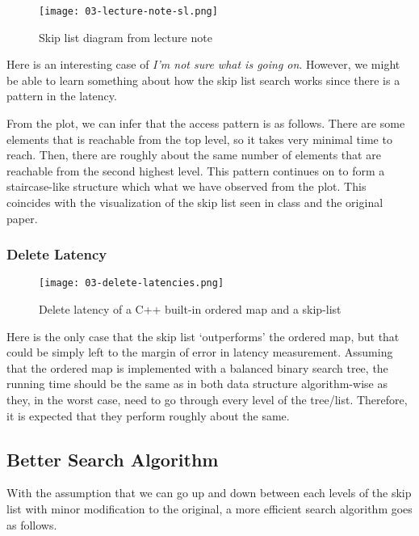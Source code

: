 \begin{wrapfigure}{l}{0.4\textwidth}
	\centering
	\texttt{[image: 03-lecture-note-sl.png]}
	\caption{Skip list diagram from lecture note}
\end{wrapfigure}

Here is an interesting case of \textit{I'm not sure what is going on}.
However, we might be able to learn something about how the skip list search works since there is a pattern in the latency.

From the plot, we can infer that the access pattern is as follows. There are some elements that is reachable from the top level, so it takes very minimal time to reach. Then, there are roughly about the same number of elements that are reachable from the second highest level. This pattern continues on to form a staircase-like structure which what we have observed from the plot. This coincides with the visualization of the skip list seen in class and the original paper.

\endgroup

\subsubsection{Delete Latency}
\begin{figure}[H]
	\begin{center}
		\texttt{[image: 03-delete-latencies.png]}
		\caption{Delete latency of a C++ built-in ordered map and a skip-list}
		\label{fig:03-delete-latency}
	\end{center}
\end{figure}

Here is the only case that the skip list `outperforms' the ordered map, but that could be simply left to the margin of error in latency measurement. Assuming that the ordered map is implemented with a balanced binary search tree, the running time should be the same as in both data structure algorithm-wise as they, in the worst case, need to go through every level of the tree/list. Therefore, it is expected that they perform roughly about the same.

\subsection{Better Search Algorithm}

With the assumption that we can go up and down between each levels of the skip list with minor modification to the original, a more efficient search algorithm goes as follows.

